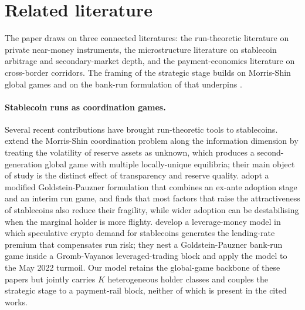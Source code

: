 \section{Related literature}\label{sec:literature}

The paper draws on three connected literatures: the run-theoretic literature on private near-money instruments, the microstructure literature on stablecoin arbitrage and secondary-market depth, and the payment-economics literature on cross-border corridors. The framing of the strategic stage builds on Morris-Shin global games \citep{morris_shin_2003_global_games} and on the bank-run formulation of \citet{goldstein_pauzner_2005_demand_deposits} that underpins \citet{diamond_dybvig_1983}.

\paragraph{Stablecoin runs as coordination games.} Several recent contributions have brought run-theoretic tools to stablecoins. \citet{ahmed_aldasoro_duley_2025} extend the Morris-Shin coordination problem along the information dimension by treating the volatility of reserve assets as unknown, which produces a second-generation global game with multiple locally-unique equilibria; their main object of study is the distinct effect of transparency and reserve quality. \citet{bertsch_2025_adoption_fragility} adopt a modified Goldstein-Pauzner formulation that combines an ex-ante adoption stage and an interim run game, and finds that most factors that raise the attractiveness of stablecoins also reduce their fragility, while wider adoption can be destabilising when the marginal holder is more flighty. \citet{gorton_klee_ross_ross_vardoulakis_2026} develop a leverage-money model in which speculative crypto demand for stablecoins generates the lending-rate premium that compensates run risk; they nest a Goldstein-Pauzner bank-run game inside a Gromb-Vayanos leveraged-trading block and apply the model to the May 2022 turmoil. Our model retains the global-game backbone of these papers but jointly carries $K$ heterogeneous holder classes and couples the strategic stage to a payment-rail block, neither of which is present in the cited works.

